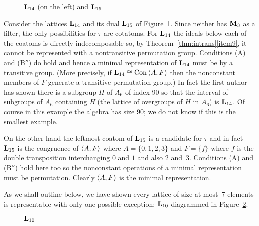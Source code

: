 \begin{figure}[htb]
\begin{center}
  \begin{tikzpicture}[scale=1]
    
  \end{tikzpicture}
  \hskip15mm
  \begin{tikzpicture}[scale=1]
    
  \end{tikzpicture}
\end{center}
\caption{$\bL_{14}$ (on the left) and $\bL_{15}$}\label{fig:L14and15}
\end{figure}


Consider the lattices $\bL_{14}$ and its dual $\bL_{15}$ 
of Figure~\ref{fig:L14and15}. Since neither
has $\bM_3$ as a filter, the only possibilities for $\tau$ are cotatoms. 
For $\bL_{14}$ the ideals below each of the coatoms is directly 
indecomposable so, by Theorem~\ref{thm:intrans}\eqref{item9}, 
it cannot be represented with a nontransitive permutation group. Conditions
(A) and (B$''$) do hold and hence a minimal representation of 
$\bL_{14}$ must be by a transitive group. (More precisely, if
$\bL_{14} \cong \Con \<A,F\>$ then the nonconstant members of $F$ generate 
a transitive permutation group.) In fact the first author has shown there is a 
subgroup $H$ of $A_6$ of index 90 so that the interval of subgroups of
$A_6$ containing $H$ (the lattice of overgroups of $H$ in $A_6$) is $\bL_{14}$.
Of course in this example the algebra has size 90; we do not
know if this is the smallest example.

On the other hand the leftmost coatom of $\bL_{15}$ is a candidate for 
$\tau$ and in fact $\bL_{15}$ is the congruence of
$\<A,F\>$ where $A = \{0,1,2,3\}$ and $F = \{f\}$ where $f$ is the double
transposition interchanging $0$ and $1$ and also $2$ and~$3$. 
Conditions (A) and (B$''$) hold here too so the nonconstant operations of a 
minimal representation must be permutation. Clearly $\<A,F\>$ is the minimal
representation.

As we shall outline below, we have shown every lattice of size at most~$7$
elements
is representable with only one possible exception: $\bL_{10}$ diagrammed 
in Figure~\ref{fig:L10}.

\begin{figure}[htb]
\begin{center}
  \begin{tikzpicture}[scale=1]
    
  \end{tikzpicture}
\end{center}
\caption{$\bL_{10}$}\label{fig:L10}
\end{figure}

